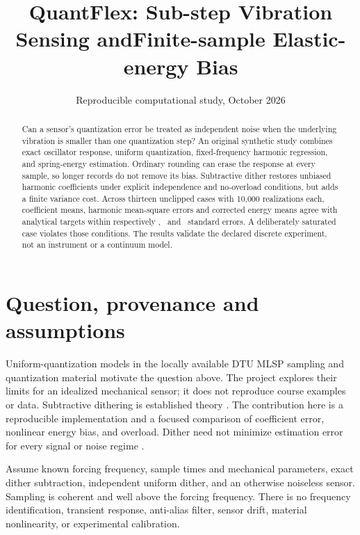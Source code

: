 \documentclass[10pt,a4paper]{article}
\title{QuantFlex: Sub-step Vibration Sensing and\newline Finite-sample Elastic-energy Bias}
\author{}
\date{Reproducible computational study, October 2026}
\begin{document}
\maketitle
\vspace{-2em}
\begin{abstract}
Can a sensor's quantization error be treated as independent noise when the
underlying vibration is smaller than one quantization step? An original synthetic
study combines exact oscillator response, uniform quantization, fixed-frequency
harmonic regression, and spring-energy estimation. Ordinary rounding can erase
the response at every sample, so longer records do not remove its bias.
Subtractive dither restores unbiased harmonic coefficients under explicit
independence and no-overload conditions, but adds a finite variance cost.
Across thirteen unclipped cases with 10,000 realizations each, coefficient means,
harmonic mean-square errors and corrected energy means agree with analytical
targets within respectively \CoefZ, \MseZ\ and \EnergyZ\ standard errors.
A deliberately saturated case violates those conditions. The results validate
the declared discrete experiment, not an instrument or a continuum model.
\end{abstract}

\section{Question, provenance and assumptions}
Uniform-quantization models in the locally available DTU MLSP sampling and
quantization material motivate the question above. The project explores their
limits for an idealized mechanical sensor; it does not reproduce course examples
or data. Subtractive dithering is established theory \cite{lipshitz}. The
contribution here is a reproducible implementation and a focused comparison of
coefficient error, nonlinear energy bias, and overload. Dither need not minimize
estimation error for every signal or noise regime \cite{rapp}.

Assume known forcing frequency, sample times and mechanical parameters, exact
dither subtraction, independent uniform dither, and an otherwise noiseless
sensor. Sampling is coherent and well above the forcing frequency. There is no
frequency identification, transient response, anti-alias filter, sensor drift,
material nonlinearity, or experimental calibration.
\end{document}

